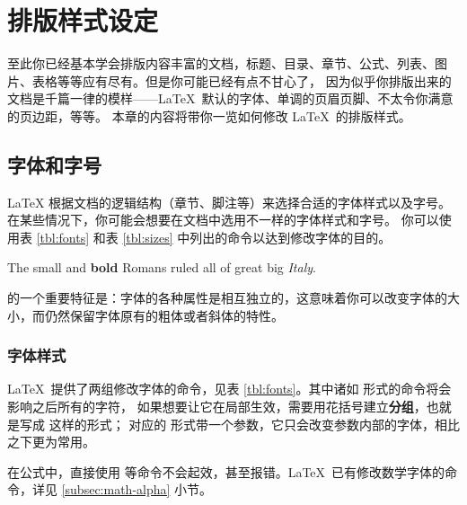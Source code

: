 \chapter{排版样式设定}

\begin{intro}
至此你已经基本学会排版内容丰富的文档，标题、目录、章节、公式、列表、图片、表格等等应有尽有。但是你可能已经有点不甘心了，
因为似乎你排版出来的文档是千篇一律的模样——\LaTeX\ 默认的字体、单调的页眉页脚、不太令你满意的页边距，等等。
本章的内容将带你一览如何修改 \LaTeX\ 的排版样式。
\end{intro}

\section{字体和字号}

\LaTeX{} 根据文档的逻辑结构（章节、脚注等）来选择合适的字体样式以及字号。
在某些情况下，你可能会想要在文档中选用不一样的字体样式和字号。
你可以使用表 \ref{tbl:fonts} 和表 \ref{tbl:sizes} 中列出的命令以达到修改字体的目的。
\begin{example}
{\small The small and
\textbf{bold} Romans ruled}
{\Large all of great big
{\itshape Italy}.}
\end{example}

\LaTeXe 的一个重要特征是：字体的各种属性是相互独立的，这意味着你可以改变字体的大小，而仍然保留字体原有的粗体或者斜体的特性。

\subsection{字体样式}

\LaTeX\ 提供了两组修改字体的命令，见表 \ref{tbl:fonts}。其中诸如  形式的命令将会影响之后所有的字符，
如果想要让它在局部生效，需要用花括号建立\textbf{分组}，也就是写成  这样的形式；
对应的  形式带一个参数，它只会改变参数内部的字体，相比之下更为常用。

在公式中，直接使用  等命令不会起效，甚至报错。\LaTeX\ 已有修改数学字体的命令，详见 \ref{subsec:math-alpha} 小节。

